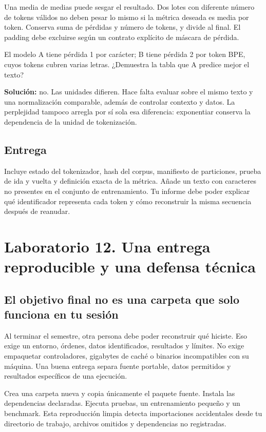 \documentclass[12pt,a4paper,oneside]{report}
\begin{document}
Una media de medias puede sesgar el resultado. Dos lotes con diferente número de tokens válidos no deben pesar lo mismo si la métrica deseada es media por token. Conserva suma de pérdidas y número de tokens, y divide al final. El padding debe excluirse según un contrato explícito de máscara de pérdida.

\begin{practica}
El modelo A tiene pérdida 1 por carácter; B tiene pérdida 2 por token BPE, cuyos tokens cubren varias letras. ¿Demuestra la tabla que A predice mejor el texto?

\textbf{Solución:} no. Las unidades difieren. Hace falta evaluar sobre el mismo texto y una normalización comparable, además de controlar contexto y datos. La perplejidad tampoco arregla por sí sola esa diferencia: exponentiar conserva la dependencia de la unidad de tokenización.

\end{practica}
\section{Entrega}
Incluye estado del tokenizador, hash del corpus, manifiesto de particiones, prueba de ida y vuelta y definición exacta de la métrica. Añade un texto con caracteres no presentes en el conjunto de entrenamiento. Tu informe debe poder explicar qué identificador representa cada token y cómo reconstruir la misma secuencia después de reanudar.

\chapter{Laboratorio 12. Una entrega reproducible y una defensa técnica}
\label{lab:doce}
\section{El objetivo final no es una carpeta que solo funciona en tu sesión}
Al terminar el semestre, otra persona debe poder reconstruir qué hiciste. Eso exige un entorno, órdenes, datos identificados, resultados y límites. No exige empaquetar controladores, gigabytes de caché o binarios incompatibles con su máquina. Una buena entrega separa fuente portable, datos permitidos y resultados específicos de una ejecución.

Crea una carpeta nueva y copia únicamente el paquete fuente. Instala las dependencias declaradas. Ejecuta pruebas, un entrenamiento pequeño y un benchmark. Esta reproducción limpia detecta importaciones accidentales desde tu directorio de trabajo, archivos omitidos y dependencias no registradas.
\end{document}

